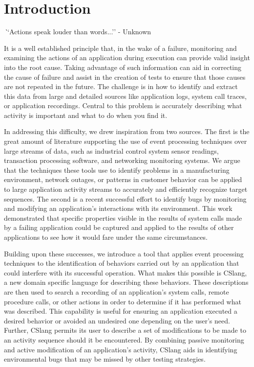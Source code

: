 \section{Introduction}
\label{SEC:introduction}


{\textit ``Actions speak louder than words...'' - Unknown}

It is a well established principle
that, in the wake of a failure,
monitoring and examining the actions
of an application
during execution can provide valid insight
into the root cause.
Taking advantage of such information
can aid in correcting
the cause of failure
and assist in the creation
of tests to ensure
that those causes
are not repeated in the future.
The challenge is in
how to identify and extract this data
from large and detailed sources like application logs,
system call traces,
or application recordings.
Central to this problem
is accurately describing what activity is important
and what to do when you find it.

In addressing this difficulty,
we drew inspiration from two sources.
The first is
the great amount of literature
supporting the use of event
processing techniques over large streams of data, such as
industrial control system sensor readings,
transaction processing software,
and networking monitoring systems.
We argue that the techniques these tools use
to identify problems in a manufacturing environment,
network outages,
or patterns in customer behavior
can be applied
to large application activity streams to accurately
and efficiently recognize target sequences.
The second is a recent successful effort
to identify bugs by monitoring
and modifying an application's interactions with its environment.
This work demonstrated that specific properties
visible in the results of system calls
made by a failing application
could be captured and applied
to the results of other applications
to see how it would fare under the same circumstances.

Building upon these successes,
we introduce a tool
that applies event processing techniques
to the identification
of behaviors carried out by an application
that could interfere with its successful operation.
What makes this possible is CSlang,
a new domain specific language
for describing these behaviors.
These descriptions are then used
to search a recording of an application's system calls,
remote procedure calls,
or other actions in order to determine if it has
performed what was described.
This capability is useful
for ensuring an application executed a desired behavior
or avoided an undesired one
depending on the user's need.
Further, CSlang permits
its user to describe a set of modifications
to be made to an activity sequence should it be encountered.
By combining passive monitoring and active modification
of an application's activity,
CSlang aids in identifying environmental bugs
that may be missed by other testing strategies.

